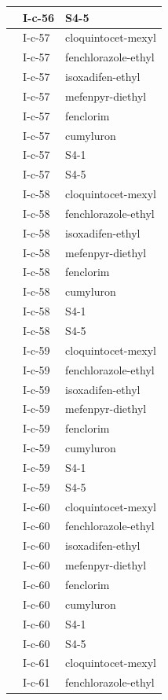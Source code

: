 \documentclass[11pt,a4paper]{article}
\begin{document}
\begin{table}[h]
\begin{tabular}{|l|l|l|}
 & I-c-56 & S4-5 \\ \hline
 & I-c-57 & cloquintocet-mexyl \\ \hline
 & I-c-57 & fenchlorazole-ethyl \\ \hline
 & I-c-57 & isoxadifen-ethyl \\ \hline
 & I-c-57 & mefenpyr-diethyl \\ \hline
 & I-c-57 & fenclorim \\ \hline
 & I-c-57 & cumyluron \\ \hline
 & I-c-57 & S4-1 \\ \hline
 & I-c-57 & S4-5 \\ \hline
 & I-c-58 & cloquintocet-mexyl \\ \hline
 & I-c-58 & fenchlorazole-ethyl \\ \hline
 & I-c-58 & isoxadifen-ethyl \\ \hline
 & I-c-58 & mefenpyr-diethyl \\ \hline
 & I-c-58 & fenclorim \\ \hline
 & I-c-58 & cumyluron \\ \hline
 & I-c-58 & S4-1 \\ \hline
 & I-c-58 & S4-5 \\ \hline
 & I-c-59 & cloquintocet-mexyl \\ \hline
 & I-c-59 & fenchlorazole-ethyl \\ \hline
 & I-c-59 & isoxadifen-ethyl \\ \hline
 & I-c-59 & mefenpyr-diethyl \\ \hline
 & I-c-59 & fenclorim \\ \hline
 & I-c-59 & cumyluron \\ \hline
 & I-c-59 & S4-1 \\ \hline
 & I-c-59 & S4-5 \\ \hline
 & I-c-60 & cloquintocet-mexyl \\ \hline
 & I-c-60 & fenchlorazole-ethyl \\ \hline
 & I-c-60 & isoxadifen-ethyl \\ \hline
 & I-c-60 & mefenpyr-diethyl \\ \hline
 & I-c-60 & fenclorim \\ \hline
 & I-c-60 & cumyluron \\ \hline
 & I-c-60 & S4-1 \\ \hline
 & I-c-60 & S4-5 \\ \hline
 & I-c-61 & cloquintocet-mexyl \\ \hline
 & I-c-61 & fenchlorazole-ethyl \\ \hline

\end{tabular}
\end{table}
\end{document}
